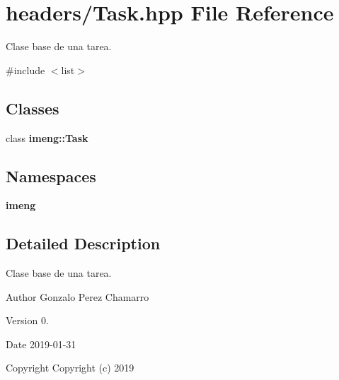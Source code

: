 \section{headers/\+Task.hpp File Reference}
\label{_task_8hpp}


Clase base de una tarea.  


{\ttfamily \#include $<$list$>$}\newline
\subsection*{Classes}
\begin{DoxyCompactItemize}
\item 
class \textbf{ imeng\+::\+Task}
\end{DoxyCompactItemize}
\subsection*{Namespaces}
\begin{DoxyCompactItemize}
\item 
 \textbf{ imeng}
\end{DoxyCompactItemize}


\subsection{Detailed Description}
Clase base de una tarea. 

\begin{DoxyAuthor}{Author}
Gonzalo Perez Chamarro 
\end{DoxyAuthor}
\begin{DoxyVersion}{Version}
0. 
\end{DoxyVersion}
\begin{DoxyDate}{Date}
2019-\/01-\/31
\end{DoxyDate}
\begin{DoxyCopyright}{Copyright}
Copyright (c) 2019 
\end{DoxyCopyright}
